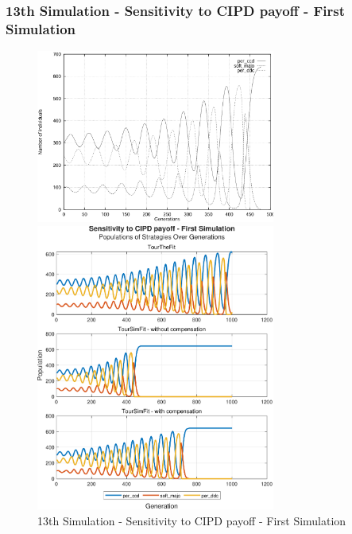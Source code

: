 \documentclass[12pt]{article}
\begin{document}
\subsubsection{13th Simulation - Sensitivity to CIPD payoff - First Simulation}
	\begin{figure}[h]
	    \centering
		\includegraphics[width=0.7\textwidth]{RefPaperFigures/fig10a.jpeg}\par\vspace{0.5em}
	    \includegraphics[width=0.7\textwidth]{Sensitivity to CIPD payoff - First Simulation.pdf}
	    \caption{13th Simulation - Sensitivity to CIPD payoff - First Simulation}
	    \label{fig:Monotonous Convergence}
	\end{figure}
\end{document}
